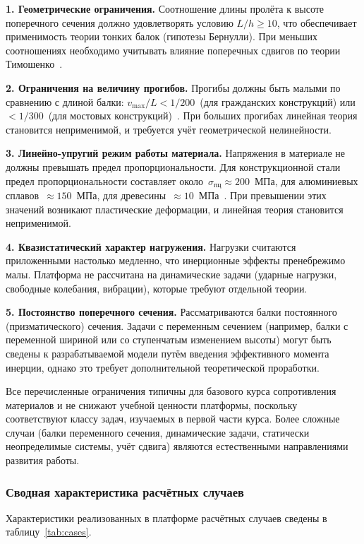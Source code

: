 \textbf{1. Геометрические ограничения.} Соотношение длины пролёта к высоте поперечного сечения должно удовлетворять условию $L / h \geq 10$, что обеспечивает применимость теории тонких балок (гипотезы Бернулли). При меньших соотношениях необходимо учитывать влияние поперечных сдвигов по теории Тимошенко~\cite{timoshenko}.

\textbf{2. Ограничения на величину прогибов.} Прогибы должны быть малыми по сравнению с длиной балки: $v_{\max} / L < 1/200$~(для гражданских конструкций) или $< 1/300$~(для мостовых конструкций)~\cite{darkov}. При больших прогибах линейная теория становится неприменимой, и требуется учёт геометрической нелинейности.

\textbf{3. Линейно-упругий режим работы материала.} Напряжения в материале не должны превышать предел пропорциональности. Для конструкционной стали предел пропорциональности составляет около~$\sigma_{\text{пц}} \approx 200$~МПа, для алюминиевых сплавов~$\approx 150$~МПа, для древесины~$\approx 10$~МПа~\cite{gere2018}. При превышении этих значений возникают пластические деформации, и линейная теория становится неприменимой.

\textbf{4. Квазистатический характер нагружения.} Нагрузки считаются приложенными настолько медленно, что инерционные эффекты пренебрежимо малы. Платформа не рассчитана на динамические задачи (ударные нагрузки, свободные колебания, вибрации), которые требуют отдельной теории.

\textbf{5. Постоянство поперечного сечения.} Рассматриваются балки постоянного (призматического) сечения. Задачи с переменным сечением (например, балки с переменной шириной или со ступенчатым изменением высоты) могут быть сведены к разрабатываемой модели путём введения эффективного момента инерции, однако это требует дополнительной теоретической проработки.

Все перечисленные ограничения типичны для базового курса сопротивления материалов и не снижают учебной ценности платформы, поскольку соответствуют классу задач, изучаемых в первой части курса. Более сложные случаи (балки переменного сечения, динамические задачи, статически неопределимые системы, учёт сдвига) являются естественными направлениями развития работы.

\subsubsection{Сводная характеристика расчётных случаев}

Характеристики реализованных в платформе расчётных случаев сведены в таблицу~\ref{tab:cases}.

